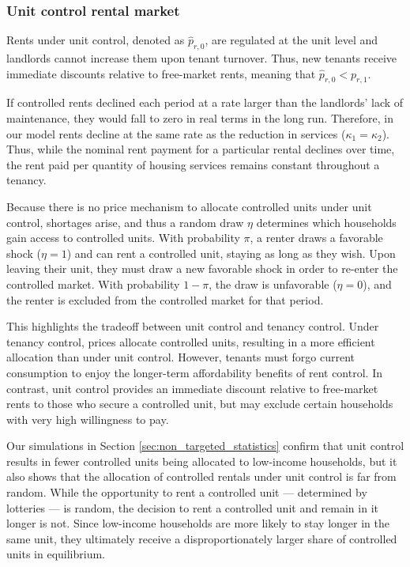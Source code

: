 \documentclass[parskip=full]{article}
\begin{document}
\subsubsection{Unit control rental market}

Rents under unit control, denoted as $\hat{p}_{r,0}$, are regulated at the unit level and landlords cannot increase them upon tenant turnover. Thus, new tenants receive immediate discounts relative to free-market rents, meaning that $\hat{p}_{r,0}<p_{r,1}$. 

If controlled rents declined each period at a rate larger than the landlords' lack of maintenance, they would fall to zero in real terms in the long run. Therefore, in our model rents decline at the same rate as the reduction in services ($\kappa_1=\kappa_2$). Thus, while the nominal rent payment for a particular rental declines over time, the rent paid per quantity of housing services remains constant throughout a tenancy. 

Because there is no price mechanism to allocate controlled units under unit control, shortages arise, and thus a random draw $\eta$ determines which households gain access to controlled units. With probability $\pi$, a renter draws a favorable shock ($\eta=1$) and can rent a controlled unit, staying as long as they wish. Upon leaving their unit, they must draw a new favorable shock in order to re-enter the controlled market. With probability $1-\pi$, the draw is unfavorable ($\eta=0$), and the renter is excluded from the controlled market for that period. 

This highlights the tradeoff between unit control and tenancy control. Under tenancy control, prices allocate controlled units, resulting in a more efficient allocation than under unit control. However, tenants must forgo current consumption to enjoy the longer-term affordability benefits of rent control. In contrast, unit control provides an immediate discount relative to free-market rents to those who secure a controlled unit, but may exclude certain households with very high willingness to pay. 

Our simulations in Section \ref{sec:non_targeted_statistics} confirm that unit control results in fewer controlled units being allocated to low-income households, but it also shows that the allocation of controlled rentals under unit control is far from random. While the opportunity to rent a controlled unit — determined by lotteries — is random, the decision to rent a controlled unit and remain in it longer is not. Since low-income households are more likely to stay longer in the same unit, they ultimately receive a disproportionately larger share of controlled units in equilibrium.
\end{document}
